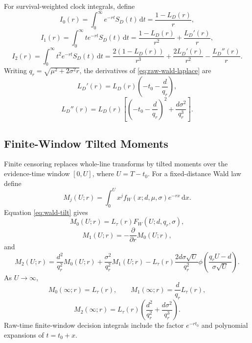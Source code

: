 \documentclass[12pt]{article}
\newcommand{\dd}{\,\mathrm{d}}
\newcommand{\phiN}{\phi}
\begin{document}
For survival-weighted clock integrals, define
\begin{equation}
  I_0(r)=\int_0^\infty e^{-rt}S_D(t)\dd t=\frac{1-L_D(r)}{r},
\end{equation}
\begin{equation}
  I_1(r)=\int_0^\infty t e^{-rt}S_D(t)\dd t
  =\frac{1-L_D(r)}{r^2}+\frac{L_D'(r)}{r},
\end{equation}
\begin{equation}
  I_2(r)=\int_0^\infty t^2 e^{-rt}S_D(t)\dd t
  =\frac{2(1-L_D(r))}{r^3}+\frac{2L_D'(r)}{r^2}-\frac{L_D''(r)}{r}.
  \label{eq:survival-moments}
\end{equation}
Writing $q_r=\sqrt{\mu^2+2\sigma^2r}$, the derivatives of \eqref{eq:raw-wald-laplace} are
\begin{equation}
  L_D'(r)=L_D(r)\left(-t_0-\frac{d}{q_r}\right),
\end{equation}
\begin{equation}
  L_D''(r)=L_D(r)\left[\left(-t_0-\frac{d}{q_r}\right)^2
  +\frac{d\sigma^2}{q_r^3}\right].
\end{equation}

\subsection{Finite-Window Tilted Moments}
Finite censoring replaces whole-line transforms by tilted moments over the evidence-time window $[0,U]$, where $U=T-t_0$. For a fixed-distance Wald law define
\begin{equation}
  M_j(U;r)=\int_0^U x^j f_W(x;d,\mu,\sigma)e^{-rx}\dd x.
\end{equation}
Equation \eqref{eq:wald-tilt} gives
\begin{equation}
  M_0(U;r)=L_\tau(r)F_W(U;d,q_r,\sigma),
\end{equation}
\begin{equation}
  M_1(U;r)=-\frac{\partial}{\partial r}M_0(U;r),
\end{equation}
and
\begin{equation}
  M_2(U;r)=
  \frac{d^2}{q_r^2}M_0(U;r)
  +\frac{\sigma^2}{q_r^2}M_1(U;r)
  -L_\tau(r)\frac{2d\sigma\sqrt{U}}{q_r^2}
  \phiN\!\left(\frac{q_rU-d}{\sigma\sqrt{U}}\right).
  \label{eq:m2-finite}
\end{equation}
As $U\to\infty$,
\begin{equation}
  M_0(\infty;r)=L_\tau(r),
  \qquad
  M_1(\infty;r)=\frac{d}{q_r}L_\tau(r),
\end{equation}
\begin{equation}
  M_2(\infty;r)=L_\tau(r)\left(\frac{d^2}{q_r^2}+\frac{d\sigma^2}{q_r^3}\right).
\end{equation}
Raw-time finite-window decision integrals include the factor $e^{-rt_0}$ and polynomial expansions of $t=t_0+x$.
\end{document}
